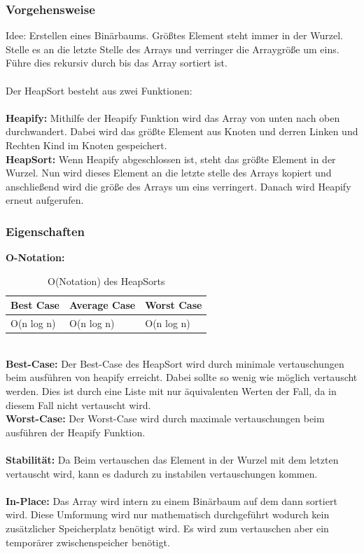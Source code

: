 \documentclass{article}
\begin{document}
\subsubsection*{Vorgehensweise}
Idee: Erstellen eines Binärbaums. Größtes Element steht immer in der Wurzel. Stelle es an die letzte Stelle des Arrays und verringer die Arraygröße um eins. Führe dies rekursiv durch bis das Array sortiert ist.\\
\\
Der HeapSort besteht aus zwei Funktionen:\\\\
\textbf{Heapify:} Mithilfe der Heapify Funktion wird das Array von unten nach oben durchwandert. Dabei wird das größte Element aus Knoten und derren Linken und Rechten Kind im Knoten gespeichert. \\
\textbf{HeapSort:} Wenn Heapify abgeschlossen ist, steht das größte Element in der Wurzel. Nun wird dieses Element an die letzte stelle des Arrays kopiert und anschließend wird die größe des Arrays um eins verringert. Danach wird Heapify erneut aufgerufen.\\
\subsubsection*{Eigenschaften}
\textbf{O-Notation:}
\begin{table}[h]
\centering
\begin{tabular}{lll}
	\hline
	\textbf{Best Case} & \textbf{Average Case} & \textbf{Worst Case} \\
	\hline
	O(n log n) & O(n log n) & O(n log n) \\
	\hline
\end{tabular}
\caption{O(Notation) des HeapSorts \cite{ONotationen}}
\label{tab:HeapSort}
\end{table}
\\
\textbf{Best-Case:} Der Best-Case des HeapSort wird durch minimale vertauschungen beim ausführen von heapify erreicht. Dabei sollte so wenig wie möglich vertauscht werden. Dies ist durch eine Liste mit nur äquivalenten Werten der Fall, da in diesem Fall nicht vertauscht wird. \\
\textbf{Worst-Case:} Der Worst-Case wird durch maximale vertauschungen beim ausführen der Heapify Funktion. \\\\
\textbf{Stabilität:} Da Beim vertauschen das Element in der Wurzel mit dem letzten vertauscht wird, kann es dadurch zu instabilen vertauschungen kommen.  \\
\\
\textbf{In-Place:} Das Array wird intern zu einem Binärbaum auf dem dann sortiert wird. Diese Umformung wird nur mathematisch durchgeführt wodurch kein zusätzlicher Speicherplatz benötigt wird. Es wird zum vertauschen aber ein temporärer zwischenspeicher benötigt. \\
\end{document}
